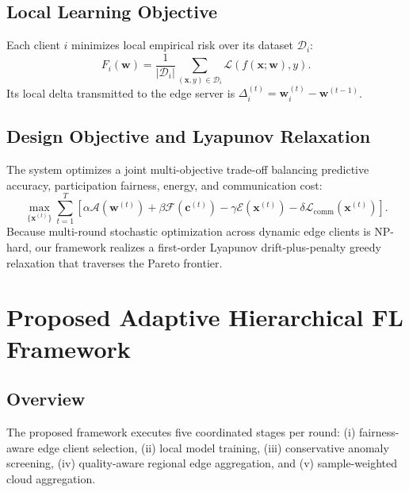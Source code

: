 \documentclass[conference]{IEEEtran}
\begin{document}
\subsection{Local Learning Objective}
Each client $i$ minimizes local empirical risk over its dataset $\mathcal{D}_i$:
\begin{equation}
F_i(\mathbf{w}) = \frac{1}{|\mathcal{D}_i|}\sum_{(\mathbf{x},y)\in\mathcal{D}_i} \mathcal{L}(f(\mathbf{x};\mathbf{w}), y).
\end{equation}
Its local delta transmitted to the edge server is $\Delta_i^{(t)} = \mathbf{w}_i^{(t)} - \mathbf{w}^{(t-1)}$.

\subsection{Design Objective and Lyapunov Relaxation}
The system optimizes a joint multi-objective trade-off balancing predictive accuracy, participation fairness, energy, and communication cost:
\begin{equation}
\max_{\{\mathbf{x}^{(t)}\}} \sum_{t=1}^T \left[ \alpha \mathcal{A}(\mathbf{w}^{(t)}) + \beta \mathcal{F}(\mathbf{c}^{(t)}) - \gamma \mathcal{E}(\mathbf{x}^{(t)}) - \delta \mathcal{L}_{\mathrm{comm}}(\mathbf{x}^{(t)}) \right].
\end{equation}
Because multi-round stochastic optimization across dynamic edge clients is NP-hard, our framework realizes a first-order Lyapunov drift-plus-penalty greedy relaxation that traverses the Pareto frontier.

\section{Proposed Adaptive Hierarchical FL Framework}
\subsection{Overview}
The proposed framework executes five coordinated stages per round: (i) fairness-aware edge client selection, (ii) local model training, (iii) conservative anomaly screening, (iv) quality-aware regional edge aggregation, and (v) sample-weighted cloud aggregation.
\end{document}
